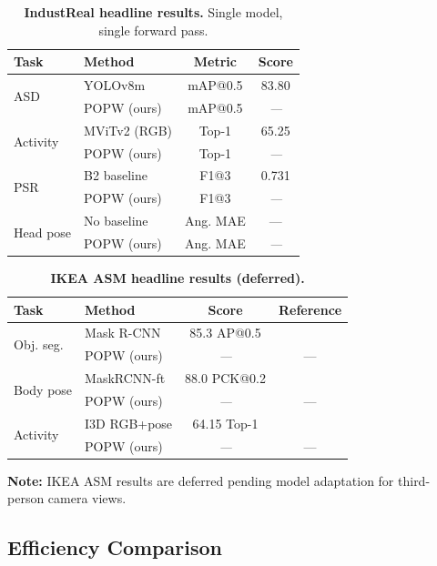 \documentclass[10pt,twocolumn]{article}
\newcommand{\popw}{POPW}
\newcommand{\todo}{\textit{---}}
\newcommand{\popwres}{\todo}
\begin{document}
\begin{table}[htbp]
\centering
\small
\caption{\textbf{IndustReal headline results.} Single model, single forward pass.}
\label{tab:industreal-headline}
\begin{tabular}{l l c c}
\toprule
\textbf{Task} & \textbf{Method} & \textbf{Metric} & \textbf{Score} \\
\midrule
\multirow{2}{*}{ASD} & YOLOv8m & mAP@0.5 & 83.80 \\
 & \popw{} (ours) & mAP@0.5 & \popwres \\
\midrule
\multirow{2}{*}{Activity} & MViTv2 (RGB) & Top-1 & 65.25 \\
 & \popw{} (ours) & Top-1 & \popwres \\
\midrule
\multirow{2}{*}{PSR} & B2 baseline & F1@3 & 0.731 \\
 & \popw{} (ours) & F1@3 & \popwres \\
\midrule
\multirow{2}{*}{Head pose} & No baseline & Ang. MAE & --- \\
 & \popw{} (ours) & Ang. MAE & \popwres \\
\bottomrule
\end{tabular}
\end{table}

\begin{table}[htbp]
\centering
\small
\caption{\textbf{IKEA ASM headline results (deferred).}}
\label{tab:ikea-headline}
\begin{tabular}{l l c c}
\toprule
\textbf{Task} & \textbf{Method} & \textbf{Score} & \textbf{Reference} \\
\midrule
\multirow{2}{*}{Obj. seg.} & Mask R-CNN & 85.3 AP@0.5 & \cite{benshabat2021ikea} \\
 & \popw{} (ours) & \popwres & --- \\
\midrule
\multirow{2}{*}{Body pose} & MaskRCNN-ft & 88.0 PCK@0.2 & \cite{benshabat2021ikea} \\
 & \popw{} (ours) & \popwres & --- \\
\midrule
\multirow{2}{*}{Activity} & I3D RGB+pose & 64.15 Top-1 & \cite{benshabat2021ikea} \\
 & \popw{} (ours) & \popwres & --- \\
\bottomrule
\end{tabular}
\end{table}

\textbf{Note:} IKEA ASM results are deferred pending model adaptation for third-person camera views.

\subsection{Efficiency Comparison}
\end{document}
